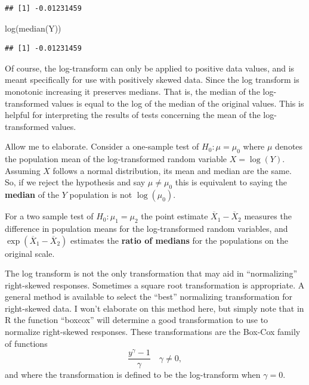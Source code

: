 \documentclass[
]{book}
\newenvironment{Shaded}{\begin{snugshade}}{\end{snugshade}}
\newcommand{\FunctionTok}[1]{\textcolor[rgb]{0.00,0.00,0.00}{#1}}
\newcommand{\NormalTok}[1]{#1}
\begin{document}
\begin{verbatim}
## [1] -0.01231459
\end{verbatim}

\begin{Shaded}
\begin{Highlighting}[]
\FunctionTok{log}\NormalTok{(}\FunctionTok{median}\NormalTok{(Y))}
\end{Highlighting}
\end{Shaded}

\begin{verbatim}
## [1] -0.01231459
\end{verbatim}

Of course, the log-transform can only be applied to positive data values, and is meant specifically for use with positively skewed data. Since the log transform is monotonic increasing it preserves medians. That is, the median of the log-transformed values is equal to the log of the median of the original values. This is helpful for interpreting the results of tests concerning the mean of the log-transformed values.

Allow me to elaborate. Consider a one-sample test of \(H_0:\mu = \mu_0\) where \(\mu\) denotes the population mean of the log-transformed random variable \(X = \log(Y)\). Assuming \(X\) follows a normal distribution, its mean and median are the same. So, if we reject the hypothesis and say \(\mu \ne \mu_0\) this is equivalent to saying the \textbf{median} of the \(Y\) population is not \(\log(\mu_0)\).

For a two sample test of \(H_0:\mu_1 = \mu_2\) the point estimate \(\overline X_1 - \overline X_2\) measures the difference in population means for the log-transformed random variables, and \(\exp(\overline X_1 - \overline X_2)\) estimates the \textbf{ratio of medians} for the populations on the original scale.

The log transform is not the only transformation that may aid in ``normalizing'' right-skewed responses. Sometimes a square root transformation is appropriate. A general method is available to select the ``best'' normalizing transformation for right-skewed data. I won't elaborate on this method here, but simply note that in R the function ``boxcox'' will determine a good transformation to use to normalize right-skewed responses. These transformations are the Box-Cox family of functions
\[\frac{y^\gamma - 1}{\gamma}\quad \gamma \ne 0, \]
and where the transformation is defined to be the log-transform when \(\gamma = 0\).
\end{document}
